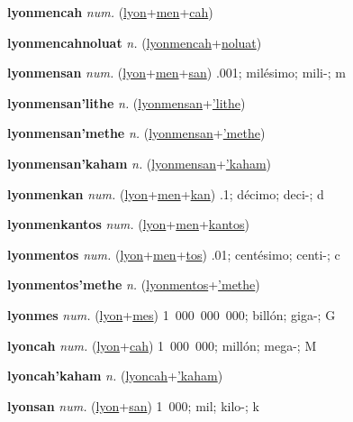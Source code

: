 \textbf{\hypertarget{lyonmencah}{lyonmencah}} \textit{num.} (\hyperlink{lyon}{lyon}+\allowbreak \hyperlink{men}{men}+\allowbreak \hyperlink{cah}{cah})


\textbf{\hypertarget{lyonmencahnoluat}{lyonmencahnoluat}} \textit{n.} (\hyperlink{lyonmencah}{lyonmencah}+\allowbreak \hyperlink{noluat}{noluat})


\textbf{\hypertarget{lyonmensan}{lyonmensan}} \textit{num.} (\hyperlink{lyon}{lyon}+\allowbreak \hyperlink{men}{men}+\allowbreak \hyperlink{san}{san})
.001; milésimo; mili-; m

\textbf{\hypertarget{lyonmensan'lithe}{lyonmensan'lithe}} \textit{n.} (\hyperlink{lyonmensan}{lyonmensan}+\allowbreak \hyperlink{'lithe}{'lithe})


\textbf{\hypertarget{lyonmensan'methe}{lyonmensan'methe}} \textit{n.} (\hyperlink{lyonmensan}{lyonmensan}+\allowbreak \hyperlink{'methe}{'methe})


\textbf{\hypertarget{lyonmensan'kaham}{lyonmensan'kaham}} \textit{n.} (\hyperlink{lyonmensan}{lyonmensan}+\allowbreak \hyperlink{'kaham}{'kaham})


\textbf{\hypertarget{lyonmenkan}{lyonmenkan}} \textit{num.} (\hyperlink{lyon}{lyon}+\allowbreak \hyperlink{men}{men}+\allowbreak \hyperlink{kan}{kan})
.1; décimo; deci-; d

\textbf{\hypertarget{lyonmenkantos}{lyonmenkantos}} \textit{num.} (\hyperlink{lyon}{lyon}+\allowbreak \hyperlink{men}{men}+\allowbreak \hyperlink{kantos}{kantos})


\textbf{\hypertarget{lyonmentos}{lyonmentos}} \textit{num.} (\hyperlink{lyon}{lyon}+\allowbreak \hyperlink{men}{men}+\allowbreak \hyperlink{tos}{tos})
.01; centésimo; centi-; c

\textbf{\hypertarget{lyonmentos'methe}{lyonmentos'methe}} \textit{n.} (\hyperlink{lyonmentos}{lyonmentos}+\allowbreak \hyperlink{'methe}{'methe})


\textbf{\hypertarget{lyonmes}{lyonmes}} \textit{num.} (\hyperlink{lyon}{lyon}+\allowbreak \hyperlink{mes}{mes})
1~000~000~000; billón; giga-; G

\textbf{\hypertarget{lyoncah}{lyoncah}} \textit{num.} (\hyperlink{lyon}{lyon}+\allowbreak \hyperlink{cah}{cah})
1~000~000; millón; mega-; M

\textbf{\hypertarget{lyoncah'kaham}{lyoncah'kaham}} \textit{n.} (\hyperlink{lyoncah}{lyoncah}+\allowbreak \hyperlink{'kaham}{'kaham})


\textbf{\hypertarget{lyonsan}{lyonsan}} \textit{num.} (\hyperlink{lyon}{lyon}+\allowbreak \hyperlink{san}{san})
1~000; mil; kilo-; k

